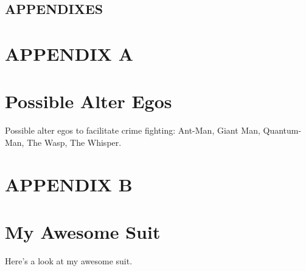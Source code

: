 \documentclass[letterpaper]{article}
\begin{document}
\begin{flushleft}
{\begin{center}
\section*{\normalfont APPENDIXES}
\vspace*{\fill}
\end{center}

\newpage
\section*{\normalfont APPENDIX A} \label{App:A}
\section*{Possible Alter Egos} 
Possible alter egos to facilitate crime fighting: Ant-Man, Giant Man, Quantum-Man, The Wasp, The Whisper. 

\newpage
\section*{\normalfont APPENDIX B} \label{App:B}
\section*{My Awesome Suit} 

Here's a look at my awesome suit. 

}

\end{flushleft}
\end{document}
